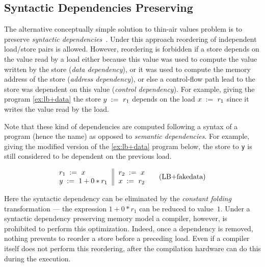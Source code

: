 
\subsection{Syntactic Dependencies Preserving}
\label{sec:analysis:deprf}

The alternative conceptually simple solution 
to thin-air values problem is to preserve 
\emph{syntactic dependencies}~\cite{Boehm-Demsky:MSPC14, Alglave-al:ASPLOS18}.
Under this approach reordering of independent load/store pairs is allowed.
However, reordering is forbidden if a store depends on the value 
read by a load either because this value 
was used to compute the value written by the store (\emph{data dependency}), 
or it was used to compute 
the memory address of the store (\emph{address dependency}),
or else a control-flow path lead to the store was dependent
on this value (\emph{control dependency}).
For example, giving the program \ref{ex:lb+data} 
the store $y\;:=_{}\;r_1$ depends 
on the load $x\;:=_{}\;r_1$ since 
it writes the value read by the load.

Note that these kind of dependencies are computed following a 
syntax of a program (hence the name) as opposed 
to \emph{semantic dependencies}.
For example, giving the modified version of 
the \ref{ex:lb+data} program below, 
the store to \texttt{y} is still considered 
to be dependent on the previous load. 

\begin{equation*}
\inarrII{
  \readInst{}{r_1}{x}           \\
  \writeInst{}{y}{1 + 0 * r_1}  \\
}{
  \readInst{}{r_2}{x}      \\
  \writeInst{}{x}{r_2}     \\
}
\tag{LB+fakedata}\label{ex:lb+fakedata}
\end{equation*}

Here the syntactic dependency can be eliminated 
by the \emph{constant folding} transformation --- 
the expression $1 + 0 * r_1$ can be reduced to value~$1$.
Under a syntactic dependency preserving memory model 
a compiler, however, is prohibited to perform this optimization. 
Indeed, once a dependency is removed, nothing prevents 
to reorder a store before a preceding load. 
Even if a compiler itself does not perform this reordering,
after the compilation hardware can 
do this during the execution.   


